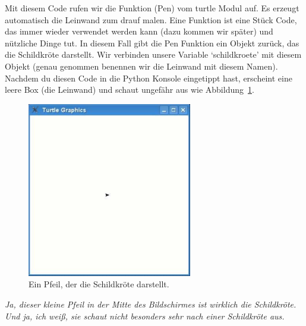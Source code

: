 Mit diesem Code rufen wir die Funktion (Pen) vom turtle Modul auf. Es erzeugt automatisch die Leinwand zum drauf malen. Eine Funktion ist eine Stück Code, das immer wieder verwendet werden kann (dazu kommen wir später) und nützliche Dinge tut. In diesem Fall gibt die Pen Funktion ein Objekt zurück, das die Schildkröte darstellt. Wir verbinden unsere Variable `schildkroete' mit diesem Objekt (genau genommen benennen wir die Leinwand mit diesem Namen). Nachdem du diesen Code in die Python Konsole eingetippt hast, erscheint eine leere Box (die Leinwand) und schaut ungefähr aus wie Abbildung~\ref{fig10}.


\begin{figure}
\begin{center}
\includegraphics[width=72mm]{images/figure10}
\end{center}
\caption{Ein Pfeil, der die Schildkröte darstellt.}\label{fig10}
\end{figure}

\emph{Ja, dieser kleine Pfeil in der Mitte des Bildschirmes ist wirklich die Schildkröte. Und ja, ich weiß, sie schaut nicht besonders sehr nach einer Schildkröte aus.}


